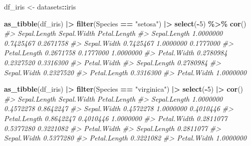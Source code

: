 \documentclass[
  xelatex, ja=standard]{bxjsbook}
\newenvironment{Shaded}{\begin{snugshade}}{\end{snugshade}}
\newcommand{\CommentTok}[1]{\textcolor[rgb]{0.56,0.35,0.01}{\textit{#1}}}
\newcommand{\DecValTok}[1]{\textcolor[rgb]{0.00,0.00,0.81}{#1}}
\newcommand{\FunctionTok}[1]{\textcolor[rgb]{0.13,0.29,0.53}{\textbf{#1}}}
\newcommand{\NormalTok}[1]{#1}
\newcommand{\OtherTok}[1]{\textcolor[rgb]{0.56,0.35,0.01}{#1}}
\newcommand{\SpecialCharTok}[1]{\textcolor[rgb]{0.81,0.36,0.00}{\textbf{#1}}}
\newcommand{\StringTok}[1]{\textcolor[rgb]{0.31,0.60,0.02}{#1}}
\theoremstyle{definition}
\theoremstyle{definition}
\theoremstyle{definition}
\theoremstyle{definition}
\theoremstyle{remark}
\begin{document}
\begin{Shaded}
\begin{Highlighting}[]
\NormalTok{df\_iris }\OtherTok{\textless{}{-}}\NormalTok{ datasets}\SpecialCharTok{::}\NormalTok{iris}
\end{Highlighting}
\end{Shaded}

\begin{Shaded}
\begin{Highlighting}[]
\FunctionTok{as\_tibble}\NormalTok{(df\_iris) }\SpecialCharTok{|\textgreater{}} \FunctionTok{filter}\NormalTok{(Species }\SpecialCharTok{==} \StringTok{"setosa"}\NormalTok{) }\SpecialCharTok{|\textgreater{}} \FunctionTok{select}\NormalTok{(}\SpecialCharTok{{-}}\DecValTok{5}\NormalTok{) }\SpecialCharTok{\%\textgreater{}\%} \FunctionTok{cor}\NormalTok{()}
\CommentTok{\#\textgreater{}              Sepal.Length Sepal.Width Petal.Length}
\CommentTok{\#\textgreater{} Sepal.Length    1.0000000   0.7425467    0.2671758}
\CommentTok{\#\textgreater{} Sepal.Width     0.7425467   1.0000000    0.1777000}
\CommentTok{\#\textgreater{} Petal.Length    0.2671758   0.1777000    1.0000000}
\CommentTok{\#\textgreater{} Petal.Width     0.2780984   0.2327520    0.3316300}
\CommentTok{\#\textgreater{}              Petal.Width}
\CommentTok{\#\textgreater{} Sepal.Length   0.2780984}
\CommentTok{\#\textgreater{} Sepal.Width    0.2327520}
\CommentTok{\#\textgreater{} Petal.Length   0.3316300}
\CommentTok{\#\textgreater{} Petal.Width    1.0000000}
\end{Highlighting}
\end{Shaded}

\begin{Shaded}
\begin{Highlighting}[]
\FunctionTok{as\_tibble}\NormalTok{(df\_iris) }\SpecialCharTok{|\textgreater{}} \FunctionTok{filter}\NormalTok{(Species }\SpecialCharTok{==} \StringTok{"virginica"}\NormalTok{) }\SpecialCharTok{|\textgreater{}} \FunctionTok{select}\NormalTok{(}\SpecialCharTok{{-}}\DecValTok{5}\NormalTok{) }\SpecialCharTok{|\textgreater{}} \FunctionTok{cor}\NormalTok{()}
\CommentTok{\#\textgreater{}              Sepal.Length Sepal.Width Petal.Length}
\CommentTok{\#\textgreater{} Sepal.Length    1.0000000   0.4572278    0.8642247}
\CommentTok{\#\textgreater{} Sepal.Width     0.4572278   1.0000000    0.4010446}
\CommentTok{\#\textgreater{} Petal.Length    0.8642247   0.4010446    1.0000000}
\CommentTok{\#\textgreater{} Petal.Width     0.2811077   0.5377280    0.3221082}
\CommentTok{\#\textgreater{}              Petal.Width}
\CommentTok{\#\textgreater{} Sepal.Length   0.2811077}
\CommentTok{\#\textgreater{} Sepal.Width    0.5377280}
\CommentTok{\#\textgreater{} Petal.Length   0.3221082}
\CommentTok{\#\textgreater{} Petal.Width    1.0000000}
\end{Highlighting}
\end{Shaded}
\end{document}
